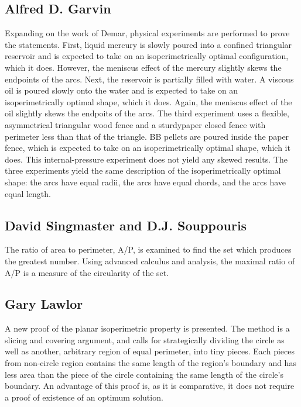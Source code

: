 \documentclass[a4paper]{book}
\numberwithin{theorem}{section}%
\begin{document}
\subsection{Alfred D. Garvin}
Expanding on the work of Demar, physical experiments are performed to prove the statements. First, liquid mercury is slowly poured into a confined triangular reservoir and is expected to take on an isoperimetrically optimal configuration, which it does. However, the meniscus effect of the mercury slightly skews the endpoints of the arcs. Next, the reservoir is partially filled with water. A viscous oil is poured slowly onto the water and is expected to take on an isoperimetrically optimal shape, which it does. Again, the meniscus effect of the oil slightly skews the endpoits of the arcs. The third experiment uses a flexible, asymmetrical triangular wood fence and a sturdypaper closed fence with perimeter less than that of the triangle. BB pellets are poured inside the paper fence, which is expected to take on an isoperimetrically optimal shape, which it does. This internal-pressure experiment does not yield any skewed results. The three experiments yield the same description of the isoperimetrically optimal shape: the arcs have equal radii, the arcs have equal chords, and the arcs have equal length.

\subsection{David Singmaster and D.J. Souppouris}
The ratio of area to perimeter, A/P, is examined to find the set which produces the greatest number. Using advanced calculus and analysis, the maximal ratio of A/P is a measure of the circularity of the set.

\subsection{Gary Lawlor}
A new proof of the planar isoperimetric property is presented. The method is a slicing and covering argument, and calls for strategically dividing the circle as well as another, arbitrary region of equal perimeter, into tiny pieces. Each pieces from non-circle region contains the same length of the region’s boundary and has less area than the piece of the circle containing the same length of the circle’s boundary. An advantage of this proof is, as it is comparative, it does not require a proof of existence of an optimum solution.
\end{document}
